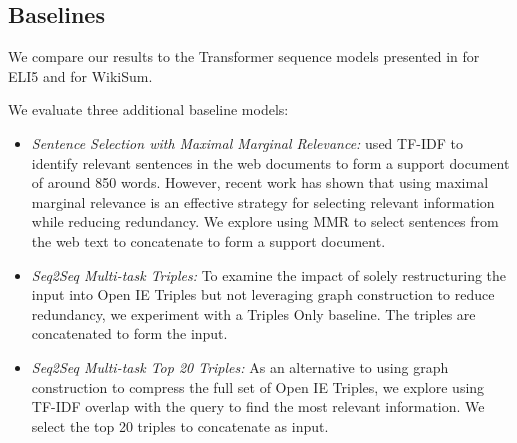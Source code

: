\documentclass[11pt,a4paper]{article}
\begin{document}
\subsection{Baselines}

We compare our results to the Transformer sequence models presented in \cite{fan2019explain} for ELI5 and \cite{liu2018generating} for WikiSum. 

We evaluate three additional baseline models: 
\begin{itemize}
    \setlength\itemsep{-0.2em}
    \item \textit{Sentence Selection with Maximal Marginal Relevance:} \cite{fan2019explain} used TF-IDF to identify relevant sentences in the web documents to form a support document of around 850 words. However, recent work \cite{fabbri2019multi} has shown that using maximal marginal relevance is an effective strategy for selecting relevant information while reducing redundancy. We explore using MMR to select sentences from the web text to concatenate to form a support document.
    \item \textit{Seq2Seq Multi-task Triples:} To examine the impact of solely restructuring the input into Open IE Triples but not leveraging graph construction to reduce redundancy, we experiment with a Triples Only baseline. The triples are concatenated to form the input.
    \item \textit{Seq2Seq Multi-task Top 20 Triples:} As an alternative to using graph construction to compress the full set of Open IE Triples, we explore using TF-IDF overlap with the query to find the most relevant information. We select the top 20 triples to concatenate as input. 
\end{itemize}
\end{document}

